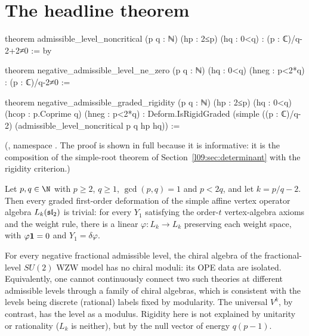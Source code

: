 \section{The headline theorem}\label{l09:sec:headline}

\begin{leancode}
theorem admissible_level_noncritical (p q : ℕ) (hp : 2≤p) (hq : 0<q) :
    (p : ℂ)/q-2+2≠0 := by
\end{leancode}
\begin{leancode}
theorem negative_admissible_level_ne_zero (p q : ℕ) (hq : 0<q) (hneg : p<2*q) :
    (p : ℂ)/q-2≠0 :=
\end{leancode}
\begin{leancode}
theorem negative_admissible_graded_rigidity (p q : ℕ) (hp : 2≤p) (hq : 0<q)
    (hcop : p.Coprime q) (hneg : p<2*q) :
    Deform.IsRigidGraded (simple ((p : ℂ)/q-2) (admissible_level_noncritical p q hp hq)) :=
\end{leancode}
(, namespace .
The proof is shown in full because it is informative: it is the composition of the simple-root theorem
of Section~\ref{l09:sec:determinant} with the rigidity criterion.)

\begin{theorem}\label{l09:thm:headline}
Let $p,q\in\N$ with $p\ge2$, $q\ge1$, $\gcd(p,q)=1$ and $p<2q$, and let $k = p/q-2$. Then every graded
first-order deformation of the simple affine vertex operator algebra $L_k(\mathfrak{sl}_2)$ is trivial: for
every $Y_1$ satisfying the order-$t$ vertex-algebra axioms and the weight rule, there is a linear
$\varphi:L_k\to L_k$ preserving each weight space, with $\varphi\mathbf{1} = 0$ and $Y_1 = \delta\varphi$.
\end{theorem}
\begin{physics}
For every negative fractional admissible level, the chiral algebra of the fractional-level $SU(2)$ WZW
model has no chiral moduli: its OPE data are isolated. Equivalently, one cannot continuously connect two such
theories at different admissible levels through a family of chiral algebras, which is consistent with the
levels being discrete (rational) labels fixed by modularity. The universal $V^k$, by contrast, has the level
as a modulus. Rigidity here is not explained by unitarity or rationality ($L_k$ is neither), but by the null
vector of energy $q(p-1)$.
\end{physics}


